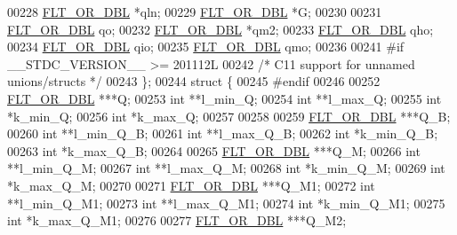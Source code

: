 \begin{DoxyCode}
00228       \hyperlink{group__data__structures_ga31125aeace516926bf7f251f759b6126}{FLT\_OR\_DBL}  *qln;
00229       \hyperlink{group__data__structures_ga31125aeace516926bf7f251f759b6126}{FLT\_OR\_DBL}  *G;
00230 
00231       \hyperlink{group__data__structures_ga31125aeace516926bf7f251f759b6126}{FLT\_OR\_DBL}  qo;
00232       \hyperlink{group__data__structures_ga31125aeace516926bf7f251f759b6126}{FLT\_OR\_DBL}  *qm2;
00233       \hyperlink{group__data__structures_ga31125aeace516926bf7f251f759b6126}{FLT\_OR\_DBL}  qho;
00234       \hyperlink{group__data__structures_ga31125aeace516926bf7f251f759b6126}{FLT\_OR\_DBL}  qio;
00235       \hyperlink{group__data__structures_ga31125aeace516926bf7f251f759b6126}{FLT\_OR\_DBL}  qmo;
00236 
00241 \textcolor{preprocessor}{#if \_\_STDC\_VERSION\_\_ >= 201112L}
00242     \textcolor{comment}{/* C11 support for unnamed unions/structs */}
00243     \};
00244     \textcolor{keyword}{struct }\{
00245 \textcolor{preprocessor}{#endif}
00246 
00252       \hyperlink{group__data__structures_ga31125aeace516926bf7f251f759b6126}{FLT\_OR\_DBL}      ***Q;
00253       \textcolor{keywordtype}{int}             **l\_min\_Q;
00254       \textcolor{keywordtype}{int}             **l\_max\_Q;
00255       \textcolor{keywordtype}{int}             *k\_min\_Q;
00256       \textcolor{keywordtype}{int}             *k\_max\_Q;
00257 
00258 
00259       \hyperlink{group__data__structures_ga31125aeace516926bf7f251f759b6126}{FLT\_OR\_DBL}      ***Q\_B;
00260       \textcolor{keywordtype}{int}             **l\_min\_Q\_B;
00261       \textcolor{keywordtype}{int}             **l\_max\_Q\_B;
00262       \textcolor{keywordtype}{int}             *k\_min\_Q\_B;
00263       \textcolor{keywordtype}{int}             *k\_max\_Q\_B;
00264 
00265       \hyperlink{group__data__structures_ga31125aeace516926bf7f251f759b6126}{FLT\_OR\_DBL}      ***Q\_M;
00266       \textcolor{keywordtype}{int}             **l\_min\_Q\_M;
00267       \textcolor{keywordtype}{int}             **l\_max\_Q\_M;
00268       \textcolor{keywordtype}{int}             *k\_min\_Q\_M;
00269       \textcolor{keywordtype}{int}             *k\_max\_Q\_M;
00270 
00271       \hyperlink{group__data__structures_ga31125aeace516926bf7f251f759b6126}{FLT\_OR\_DBL}      ***Q\_M1;
00272       \textcolor{keywordtype}{int}             **l\_min\_Q\_M1;
00273       \textcolor{keywordtype}{int}             **l\_max\_Q\_M1;
00274       \textcolor{keywordtype}{int}             *k\_min\_Q\_M1;
00275       \textcolor{keywordtype}{int}             *k\_max\_Q\_M1;
00276 
00277       \hyperlink{group__data__structures_ga31125aeace516926bf7f251f759b6126}{FLT\_OR\_DBL}      ***Q\_M2;

\end{DoxyCode}
